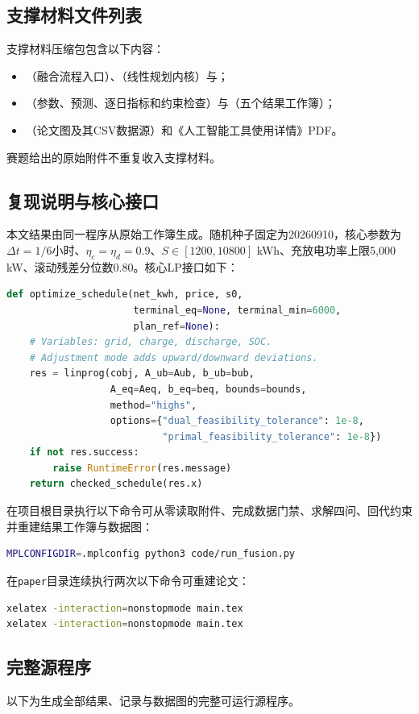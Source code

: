 \subsection*{支撑材料文件列表}
支撑材料压缩包包含以下内容：
\begin{itemize}
\item {}（融合流程入口）、（线性规划内核）与；
\item {}（参数、预测、逐日指标和约束检查）与（五个结果工作簿）；
\item {}（论文图及其CSV数据源）和《人工智能工具使用详情》PDF。
\end{itemize}
赛题给出的原始附件不重复收入支撑材料。

\subsection*{复现说明与核心接口}
本文结果由同一程序从原始工作簿生成。随机种子固定为20260910，核心参数为$\Delta t=1/6$小时、$\eta_c=\eta_d=0.9$、$S\in[1200,10800]$ kWh、充放电功率上限5,000 kW、滚动残差分位数0.80。核心LP接口如下：
\begin{lstlisting}[language=Python]
def optimize_schedule(net_kwh, price, s0,
                      terminal_eq=None, terminal_min=6000,
                      plan_ref=None):
    # Variables: grid, charge, discharge, SOC.
    # Adjustment mode adds upward/downward deviations.
    res = linprog(cobj, A_ub=Aub, b_ub=bub,
                  A_eq=Aeq, b_eq=beq, bounds=bounds,
                  method="highs",
                  options={"dual_feasibility_tolerance": 1e-8,
                           "primal_feasibility_tolerance": 1e-8})
    if not res.success:
        raise RuntimeError(res.message)
    return checked_schedule(res.x)
\end{lstlisting}
在项目根目录执行以下命令可从零读取附件、完成数据门禁、求解四问、回代约束并重建结果工作簿与数据图：
\begin{lstlisting}[language=bash]
MPLCONFIGDIR=.mplconfig python3 code/run_fusion.py
\end{lstlisting}
在\texttt{paper}目录连续执行两次以下命令可重建论文：
\begin{lstlisting}[language=bash]
xelatex -interaction=nonstopmode main.tex
xelatex -interaction=nonstopmode main.tex
\end{lstlisting}

\subsection*{完整源程序}
以下为生成全部结果、记录与数据图的完整可运行源程序。

